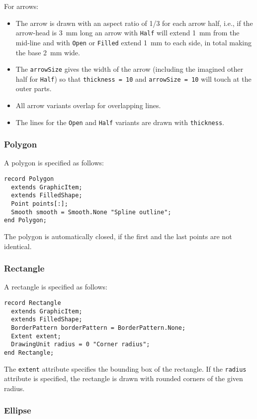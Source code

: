 For arrows:
\begin{itemize}
\item
  The arrow is drawn with an aspect ratio of 1/3 for each arrow half, i.e., if the arrow-head is 3~mm long an arrow with \lstinline!Half! will extend 1~mm from the mid-line and with \lstinline!Open! or \lstinline!Filled! extend 1~mm to each side, in total making the base 2~mm wide.
\item
  The \lstinline!arrowSize! gives the width of the arrow (including the imagined other half for \lstinline!Half!) so that \lstinline!thickness = 10! and \lstinline!arrowSize = 10! will touch at the outer parts.
\item
  All arrow variants overlap for overlapping lines.
\item
  The lines for the \lstinline!Open! and \lstinline!Half! variants are drawn with \lstinline!thickness!.
\end{itemize}

\subsubsection{Polygon}\label{polygon}

A polygon is specified as follows:
\begin{lstlisting}[language=modelica]
record Polygon
  extends GraphicItem;
  extends FilledShape;
  Point points[:];
  Smooth smooth = Smooth.None "Spline outline";
end Polygon;
\end{lstlisting}%
The polygon is automatically closed, if the first and the last points are not identical.

\subsubsection{Rectangle}\label{rectangle}

A rectangle is specified as follows:
\begin{lstlisting}[language=modelica]
record Rectangle
  extends GraphicItem;
  extends FilledShape;
  BorderPattern borderPattern = BorderPattern.None;
  Extent extent;
  DrawingUnit radius = 0 "Corner radius";
end Rectangle;
\end{lstlisting}%
The \lstinline!extent! attribute specifies the bounding box of the rectangle.
If the \lstinline!radius! attribute is specified, the rectangle is drawn with rounded corners of the given radius.

\subsubsection{Ellipse}\label{ellipse}

